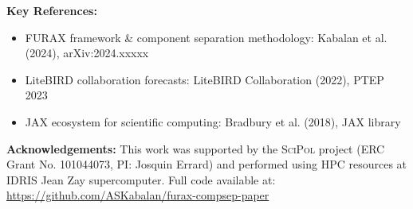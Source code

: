 \documentclass[a2paper,portrait,fontscale=0.9]{baposter}
\newcommand{\compresslist}{
	\setlength{\itemsep}{1pt}
	\setlength{\parskip}{0pt}
	\setlength{\parsep}{0pt}
}
\begin{document}
\begin{poster}
{\textbf{Key References:}
\begin{itemize}[leftmargin=0.5cm] \compresslist
    \item FURAX framework \& component separation methodology: Kabalan et al. (2024), arXiv:2024.xxxxx
    \item LiteBIRD collaboration forecasts: LiteBIRD Collaboration (2022), PTEP 2023
    \item JAX ecosystem for scientific computing: Bradbury et al. (2018), JAX library
\end{itemize}

\textbf{Acknowledgements:} This work was supported by the \textsc{SciPol} project (ERC Grant No. 101044073, PI: Josquin Errard) and performed using HPC resources at IDRIS Jean Zay supercomputer. Full code available at: \url{https://github.com/ASKabalan/furax-compsep-paper}

\vspace{0.2cm}
}

\end{poster}
\end{document}
